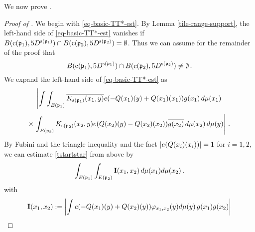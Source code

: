 We now prove .
\begin{proof}[Proof of ]
We begin with \eqref{eq-basic-TT*-est}.
By Lemma \ref{tile-range-support}, the left-hand side of \eqref{eq-basic-TT*-est} vanishes if
$B({\mathrm{c}}({\mathfrak p}_1),5D^{{\mathrm{s}}({\mathfrak p}_1)}) \cap B({\mathrm{c}}({\mathfrak p}_2),5D^{{\mathrm{s}}({\mathfrak p}_2)}) = \emptyset$.
Thus we can assume for the remainder of the proof that
\begin{equation}
        \label{intersec5B}
        B({\mathrm{c}}({\mathfrak p}_1),5D^{{\mathrm{s}}({\mathfrak p}_1)}) \cap B({\mathrm{c}}({\mathfrak p}_2),5D^{{\mathrm{s}}({\mathfrak p}_2)}) \neq \emptyset\,.
\end{equation}
We expand the left-hand side of \eqref{eq-basic-TT*-est} as
\begin{equation}\label{tstartstar}
\left|\int \int_{E({\mathfrak p}_1)} \overline{K_{{\mathrm{s}}({\mathfrak p}_1)}(x_1,y)}e(-{Q}(x_1)(y)+
    {Q}(x_1)(x_1))g(x_1)\, d\mu(x_1) \right.
\end{equation}
\begin{equation}
 \times \left.\int_{E({\mathfrak p}_2)} {K_{{\mathrm{s}}({\mathfrak p}_2)}(x_2,y)}e({Q}(x_2)(y)
    -{Q}(x_2)(x_2))\overline{g(x_2)}\, d\mu(x_2)\, d\mu(y)\right|\, .
\end{equation}
By Fubini and the triangle inequality and
the fact $|e({Q}(x_i)(x_i))|=1$ for $i=1,2$, we can estimate
\eqref{tstartstar} from above by
\begin{equation}\label{eqa1}
    \int_{E({\mathfrak p}_1)} \int_{E({\mathfrak p}_2)} {\bf I}(x_1, x_2)\, d\mu(x_1)d\mu(x_2)\,.
\end{equation}
with
\begin{equation}
    {\bf I}(x_1, x_2):=
    \left|\int
    e(-{Q}(x_1)(y)+{Q}(x_2)(y))\varphi_{x_1,x_2}(y)
    d\mu(y) \, g(x_1)g(x_2)\right|
\end{equation}



\end{proof}
